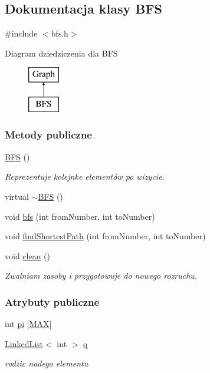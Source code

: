 \hypertarget{class_b_f_s}{\subsection{Dokumentacja klasy B\-F\-S}
\label{class_b_f_s}
}


{\ttfamily \#include $<$bfs.\-h$>$}

Diagram dziedziczenia dla B\-F\-S\begin{figure}[H]
\begin{center}
\leavevmode
\includegraphics[height=2.000000cm]{class_b_f_s}
\end{center}
\end{figure}
\subsubsection*{Metody publiczne}
\begin{DoxyCompactItemize}
\item 
\hyperlink{class_b_f_s_ae2f1a5dc47c9791ad2d90e40e812d229}{B\-F\-S} ()
\begin{DoxyCompactList}\small\item\em Reprezentuje kolejnke elementów po wizycie. \end{DoxyCompactList}\item 
virtual \hyperlink{class_b_f_s_af70cee98b79886431c5d3f451d78f712}{$\sim$\-B\-F\-S} ()
\item 
void \hyperlink{class_b_f_s_a392b91df16399ab3be7e3745379d9dc0}{bfs} (int from\-Number, int to\-Number)
\item 
void \hyperlink{class_b_f_s_a42789813e256a0225a26cf418c7754a2}{find\-Shortest\-Path} (int from\-Number, int to\-Number)
\item 
void \hyperlink{class_b_f_s_a5d7b36488122996dc5877cd611afcaef}{clean} ()
\begin{DoxyCompactList}\small\item\em Zwalniam zasoby i przygotowuje do nowego rozruchu. \end{DoxyCompactList}\end{DoxyCompactItemize}
\subsubsection*{Atrybuty publiczne}
\begin{DoxyCompactItemize}
\item 
int \hyperlink{class_b_f_s_a1191eb3076bf8f3f412cc68563c0b46f}{pi} \mbox{[}\hyperlink{graph_8h_a392fb874e547e582e9c66a08a1f23326}{M\-A\-X}\mbox{]}
\item 
\hyperlink{class_linked_list}{Linked\-List}$<$ int $>$ \hyperlink{class_b_f_s_a317da6453a9b8e73f62e2bc60e9894fa}{q}
\begin{DoxyCompactList}\small\item\em rodzic nadego elementu \end{DoxyCompactList}\end{DoxyCompactItemize}


